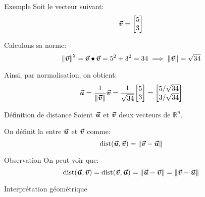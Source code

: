 \documentclass[a4paper]{article}
\begin{document}
\begin{parag}{Exemple}
    Soit le vecteur suivant: 
    \[\bm{\protect\vec{v}} = \begin{bmatrix} 5 \\ 3 \end{bmatrix} \]

    Calculons sa norme: 
    \[\left\|\bvec{v}\right\|^2 = \bvec{v} \dotprod \bvec{v} = 5^2+ 3^2 = 34 \implies \left\|\bvec{v}\right\| = \sqrt{34}\]
    
    Ainsi, par normalisation, on obtient: 
    \[\bvec{u} = \frac{1}{\left\|\bvec{v}\right\|}\bvec{v} = \frac{1}{\sqrt{34}} \begin{bmatrix} 5 \\ 3 \end{bmatrix} = \begin{bmatrix} 5 / \sqrt{34} \\ 3 / \sqrt{34} \end{bmatrix} \]
    
\end{parag}

\begin{parag}{Définition de distance}
    Soient $\bm{\protect\vec{u}}$ et $\bm{\protect\vec{v}}$ deux vecteurs de $\mathbb{R}^n$. 

    On définit la  entre $\bm{\protect\vec{u}}$ et $\bm{\protect\vec{v}}$ comme: 
    \[\dist\left(\bvec{u}, \bvec{v}\right) = \left\|\bvec{v} - \bvec{u}\right\|\]
    
    \begin{subparag}{Observation}
        On peut voir que: 
        \[\dist\left(\bvec{u}, \bvec{v}\right) = \dist\left(\bvec{v}, \bvec{u}\right) = \left\|\bvec{u} - \bvec{v}\right\| = \left\|\bvec{v} - \bvec{u}\right\|\]
    \end{subparag}
   
    \begin{subparag}{Interprétation géométrique}
    \end{subparag}
\end{parag}
\end{document}
